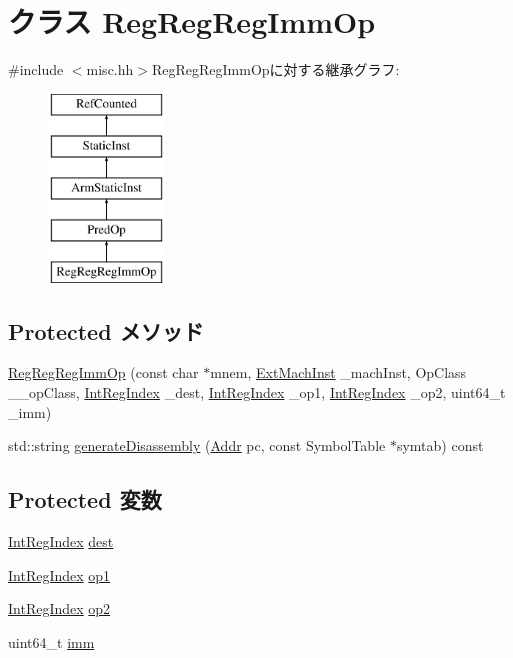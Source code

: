 \hypertarget{classRegRegRegImmOp}{
\section{クラス RegRegRegImmOp}
\label{classRegRegRegImmOp}
}


{\ttfamily \#include $<$misc.hh$>$}RegRegRegImmOpに対する継承グラフ:\begin{figure}[H]
\begin{center}
\leavevmode
\includegraphics[height=5cm]{classRegRegRegImmOp}
\end{center}
\end{figure}
\subsection*{Protected メソッド}
\begin{DoxyCompactItemize}
\item 
\hyperlink{classRegRegRegImmOp_ae40a8ce5cca6288868919642d9e65170}{RegRegRegImmOp} (const char $\ast$mnem, \hyperlink{classStaticInst_a5605d4fc727eae9e595325c90c0ec108}{ExtMachInst} \_\-machInst, OpClass \_\-\_\-opClass, \hyperlink{namespaceArmISA_ae64680ba9fb526106829d6bf92fc791b}{IntRegIndex} \_\-dest, \hyperlink{namespaceArmISA_ae64680ba9fb526106829d6bf92fc791b}{IntRegIndex} \_\-op1, \hyperlink{namespaceArmISA_ae64680ba9fb526106829d6bf92fc791b}{IntRegIndex} \_\-op2, uint64\_\-t \_\-imm)
\item 
std::string \hyperlink{classRegRegRegImmOp_a95d323a22a5f07e14d6b4c9385a91896}{generateDisassembly} (\hyperlink{classm5_1_1params_1_1Addr}{Addr} pc, const SymbolTable $\ast$symtab) const 
\end{DoxyCompactItemize}
\subsection*{Protected 変数}
\begin{DoxyCompactItemize}
\item 
\hyperlink{namespaceArmISA_ae64680ba9fb526106829d6bf92fc791b}{IntRegIndex} \hyperlink{classRegRegRegImmOp_aec72e8e45bdc87abeeeb75d2a8a9a716}{dest}
\item 
\hyperlink{namespaceArmISA_ae64680ba9fb526106829d6bf92fc791b}{IntRegIndex} \hyperlink{classRegRegRegImmOp_a4c465c43ad568f8bcf8ae71480e9cfea}{op1}
\item 
\hyperlink{namespaceArmISA_ae64680ba9fb526106829d6bf92fc791b}{IntRegIndex} \hyperlink{classRegRegRegImmOp_a7799ff6cbe5a252199059eb8665820e7}{op2}
\item 
uint64\_\-t \hyperlink{classRegRegRegImmOp_a2b4406ad2843b5aa12d244d01d8fdc69}{imm}
\end{DoxyCompactItemize}


